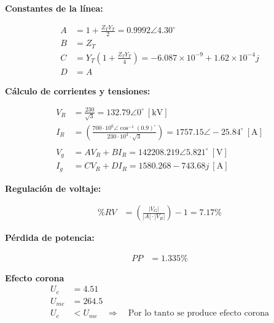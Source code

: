\textbf{Constantes de la línea:}

\begin{align*}
A &= 1 + \frac{Z_T Y_T}{2} = 0.9992 \angle 4.30^\circ \\
B &= Z_T \\
C &= Y_T \left( 1 + \frac{Z_T Y_T}{4} \right) = -6.087 \times 10^{-9} + 1.62 \times 10^{-4} j \\
D &= A
\end{align*}


\textbf{Cálculo de corrientes y tensiones:}

\begin{align*}
V_R &= \frac{230}{\sqrt{3}} = 132.79 \angle 0^\circ ~[\text{kV}] \\
I_R &= \left( \frac{700 \cdot 10^6 \angle \cos^{-1}(0.9)^\circ  }{230 \cdot 10^3 \cdot \sqrt{3}} \right) 
= 1757.15 \angle -25.84^\circ~[\text{A}] \\
\\
V_g &= A V_R + B I_R = 142208.219 \angle 5.821^\circ~[\text{V}] \\
I_g &= C V_R + D I_R = 1580.268 - 743.68j~[\text{A}]
\end{align*}

\vspace{1em}

\textbf{Regulación de voltaje:}

\begin{align*}
\%RV &= \left( \frac{ |V_G| }{ |A| \cdot |V_R| } \right) - 1 = 7.17\%
\end{align*}

\vspace{1em}

\textbf{Pérdida de potencia:}

\begin{align*}
PP &= 1.335\%
\end{align*}

\textbf{Efecto corona}
\begin{align*}
U_c &= 4.51 \\
U_{me} &= 264.5 \\
U_c &< U_{me} \quad \Rightarrow \quad \text{Por lo tanto se produce efecto corona}
\end{align*}